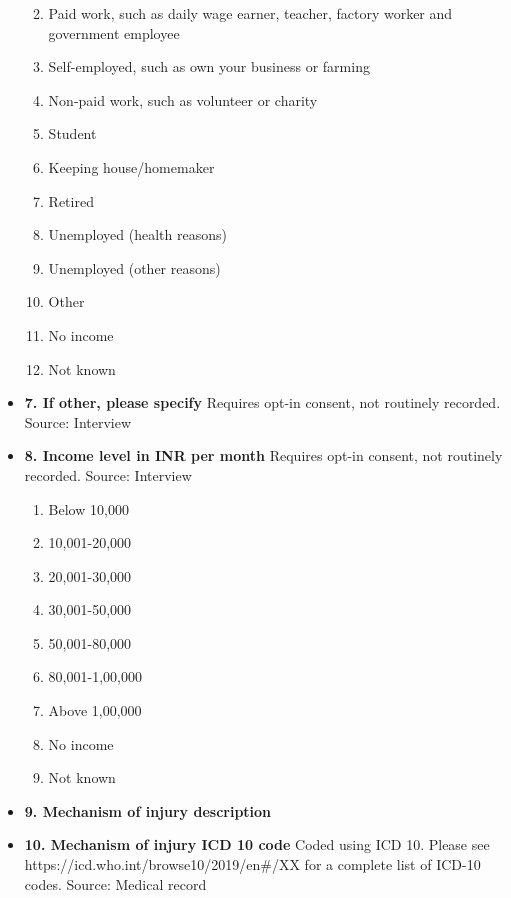 \documentclass[
]{scrartcl}
\providecommand{\tightlist}{%
  \setlength{\itemsep}{0pt}\setlength{\parskip}{0pt}}\usepackage{longtable,booktabs,array}
\begin{document}
\begin{itemize}
  \begin{enumerate}
  \def\labelenumi{\arabic{enumi}.}
  \tightlist
  \item
    Paid work, such as daily wage earner, teacher, factory worker and
    government employee
  \item
    Self-employed, such as own your business or farming
  \item
    Non-paid work, such as volunteer or charity
  \item
    Student
  \item
    Keeping house/homemaker
  \item
    Retired
  \item
    Unemployed (health reasons)
  \item
    Unemployed (other reasons)
  \item
    Other
  \item
    No income
  \item
    Not known
  \end{enumerate}
\item
  \textbf{7. If other, please specify} Requires opt-in consent, not
  routinely recorded. Source: Interview
\item
  \textbf{8. Income level in INR per month} Requires opt-in consent, not
  routinely recorded. Source: Interview

  \begin{enumerate}
  \def\labelenumi{\arabic{enumi}.}
  \tightlist
  \item
    Below 10,000
  \item
    10,001-20,000
  \item
    20,001-30,000
  \item
    30,001-50,000
  \item
    50,001-80,000
  \item
    80,001-1,00,000
  \item
    Above 1,00,000
  \item
    No income
  \item
    Not known
  \end{enumerate}
\item
  \textbf{9. Mechanism of injury description}
\item
  \textbf{10. Mechanism of injury ICD 10 code} Coded using ICD 10.
  Please see https://icd.who.int/browse10/2019/en\#/XX for a complete
  list of ICD-10 codes. Source: Medical record


\end{itemize}
\end{document}
